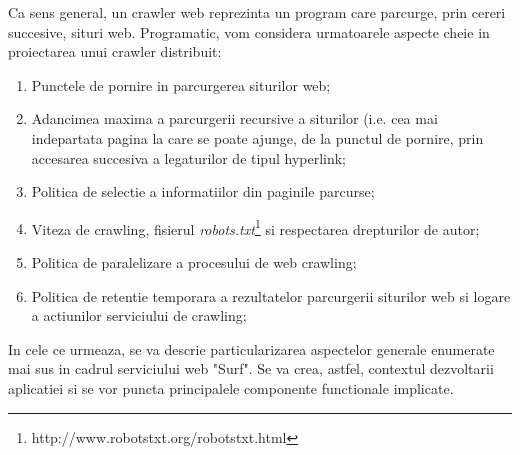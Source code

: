 \newcommand{\robotsTxtDescription}{http://www.robotstxt.org/robotstxt.html}

Ca sens general, un crawler web reprezinta un program care parcurge, prin cereri succesive, situri web. Programatic, vom considera urmatoarele aspecte cheie in proiectarea unui crawler distribuit:

\begin{enumerate}

	\item{Punctele de pornire in parcurgerea siturilor web;}
	
	\item{Adancimea maxima a parcurgerii recursive a siturilor (i.e. cea mai indepartata pagina la care se poate ajunge, de la punctul de pornire, prin accesarea succesiva a legaturilor de tipul hyperlink;}
	
	\item{Politica de selectie a informatiilor din paginile parcurse\cite{web-crawler-selection-policy};}
	
	\item{Viteza de crawling, fisierul \emph{robots.txt}\footnote{\robotsTxtDescription} si respectarea drepturilor de autor;}
	
	\item{Politica de paralelizare a procesului de web crawling;}
	
	\item{Politica de retentie temporara a rezultatelor parcurgerii siturilor web si logare a actiunilor serviciului de crawling;}
	
\end{enumerate}

In cele ce urmeaza, se va descrie particularizarea aspectelor generale enumerate mai sus in cadrul serviciului web "Surf". Se va crea, astfel, contextul dezvoltarii aplicatiei si se vor puncta principalele componente functionale implicate.
